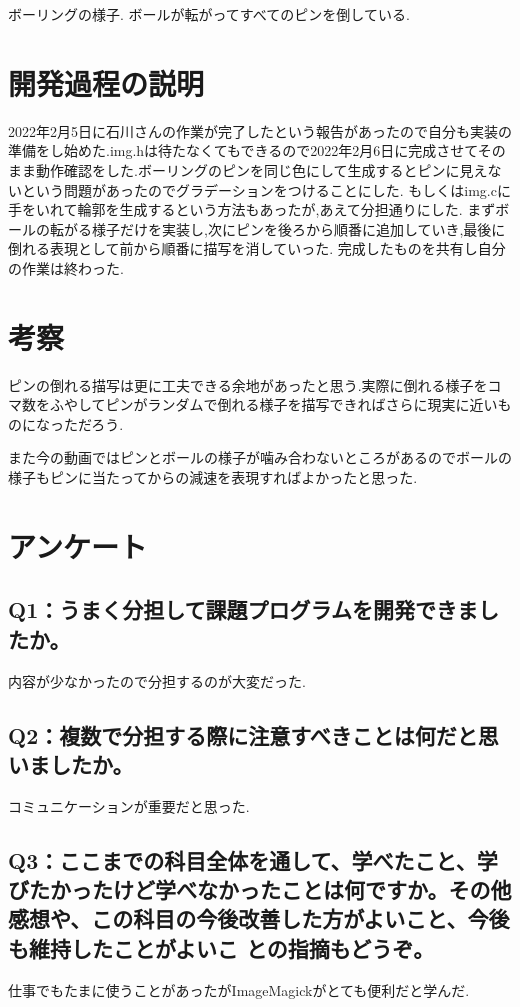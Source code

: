 \documentclass[12pt,a4j]{jarticle}
\begin{document}
ボーリングの様子.
ボールが転がってすべてのピンを倒している.

\section{開発過程の説明}
2022年2月5日に石川さんの作業が完了したという報告があったので自分も実装の準備をし始めた.img.hは待たなくてもできるので2022年2月6日に完成させてそのまま動作確認をした.ボーリングのピンを同じ色にして生成するとピンに見えないという問題があったのでグラデーションをつけることにした.
もしくはimg.cに手をいれて輪郭を生成するという方法もあったが,あえて分担通りにした.
まずボールの転がる様子だけを実装し,次にピンを後ろから順番に追加していき,最後に倒れる表現として前から順番に描写を消していった.
完成したものを共有し自分の作業は終わった.

\section{考察}

ピンの倒れる描写は更に工夫できる余地があったと思う.実際に倒れる様子をコマ数をふやしてピンがランダムで倒れる様子を描写できればさらに現実に近いものになっただろう.

また今の動画ではピンとボールの様子が噛み合わないところがあるのでボールの様子もピンに当たってからの減速を表現すればよかったと思った.

\section{アンケート}

\subsection{Q1：うまく分担して課題プログラムを開発できましたか。}

内容が少なかったので分担するのが大変だった.

\subsection{Q2：複数で分担する際に注意すべきことは何だと思いましたか。}

コミュニケーションが重要だと思った.

\subsection{Q3：ここまでの科目全体を通して、学べたこと、学びたかったけど学べなかったことは何ですか。その他感想や、この科目の今後改善した方がよいこと、今後も維持したことがよいこ との指摘もどうぞ。}

仕事でもたまに使うことがあったがImageMagickがとても便利だと学んだ.
\end{document}
